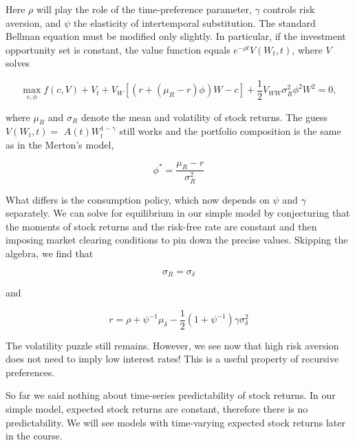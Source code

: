 \documentclass[\topdir/lecture\_notes.tex]{subfiles}
\begin{document}
Here $\rho$ will play the role of the time-preference parameter, $\gamma$ controls risk aversion, and $\psi$ the elasticity of intertemporal substitution. The standard Bellman equation must be modified only slightly. In particular, if the investment opportunity set is constant, the value function equals $e^{-\rho t} V\left(W_{t}, t\right)$, where $V$ solves

\begin{equation}
\max _{c, \phi} f(c, V)+V_{t}+V_{W}\left[\left(r+\left(\mu_{R}-r\right) \phi\right) W-c\right]+\frac{1}{2} V_{W W} \sigma_{R}^{2} \phi^{2} W^{2}=0,
\end{equation}

where $\mu_{R}$ and $\sigma_{R}$ denote the mean and volatility of stock returns. The guess $V\left(W_{t}, t\right)=$ $A(t) W_{t}^{1-\gamma}$ still works and the portfolio composition is the same as in the Merton's model,

\begin{equation}
\phi^{*}=\frac{\mu_{R}-r}{\sigma_{R}^{2}}
\end{equation}

What differs is the consumption policy, which now depends on $\psi$ and $\gamma$ separately. We can solve for equilibrium in our simple model by conjecturing that the moments of stock returns and the risk-free rate are constant and then imposing market clearing conditions to pin down the precise values. Skipping the algebra, we find that

\begin{equation}
\sigma_{R}=\sigma_{\delta}
\end{equation}

and

\begin{equation}
r=\rho+\psi^{-1} \mu_{\delta}-\frac{1}{2}\left(1+\psi^{-1}\right) \gamma \sigma_{\delta}^{2}
\end{equation}

The volatility puzzle still remains. However, we see now that high risk aversion does not need to imply low interest rates! This is a useful property of recursive preferences.

So far we said nothing about time-series predictability of stock returns. In our simple model, expected stock returns are constant, therefore there is no predictability. We will see models with time-varying expected stock returns later in the course.
\end{document}
